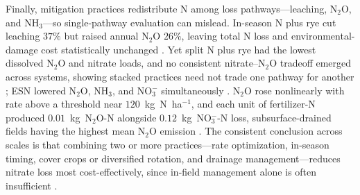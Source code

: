 Finally, mitigation practices redistribute N among loss pathways---leaching,
N$_2$O, and NH$_3$---so single-pathway evaluation can mislead. In-season N plus
rye cut leaching $37\%$ but raised annual N$_2$O $26\%$, leaving total N loss
and environmental-damage cost statistically unchanged \parencite{PrezaFontes2023}.
Yet split N plus rye had the lowest dissolved N$_2$O and nitrate loads, and no
consistent nitrate--N$_2$O tradeoff emerged across systems, showing stacked
practices need not trade one pathway for another
\parencite{Oliveira2025,OBrien2022}; ESN lowered N$_2$O, NH$_3$, and NO$_3^-$
simultaneously \parencite{Menegaz2025}. N$_2$O rose nonlinearly with rate above
a threshold near $120$~kg~N~ha$^{-1}$, and each unit of fertilizer-N produced
$0.01$~kg~N$_2$O-N alongside $0.12$~kg~NO$_3^-$-N loss, subsurface-drained
fields having the highest mean N$_2$O emission
\parencite{Wang2016b,Chatterjee2020b,Fontes2019}. The consistent conclusion
across scales is that combining two or more practices---rate optimization,
in-season timing, cover crops or diversified rotation, and drainage
management---reduces nitrate loss most cost-effectively, since in-field
management alone is often insufficient \parencite{Dinnes2002,Singh2023}.